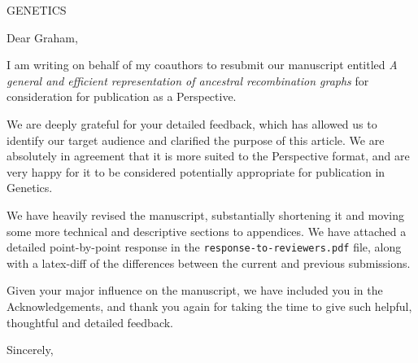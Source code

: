 \documentclass{letter}
\begin{document}
\begin{letter}{GENETICS}

\opening{Dear Graham,}

I am writing on behalf of my coauthors to resubmit our 
manuscript entitled
\emph{A general and efficient representation of ancestral recombination graphs}
for consideration for publication as a Perspective.

We are deeply grateful for your detailed feedback, which has allowed us 
to identify our target audience and clarified the purpose of this article.
We are absolutely in agreement that it is more suited to the Perspective
format, and are very happy for it to be considered potentially appropriate
for publication in Genetics.

We have heavily revised the manuscript, substantially shortening it
and moving some more technical and descriptive sections to appendices.
We have attached a detailed point-by-point response in the 
\texttt{response-to-reviewers.pdf} file, along with a 
latex-diff of the differences between the current and previous submissions.

Given your major influence on the manuscript, we have included you in the
Acknowledgements, and thank you again for taking the time to give
such helpful, thoughtful and detailed feedback.

\closing{Sincerely,}

\end{letter}
\end{document}
